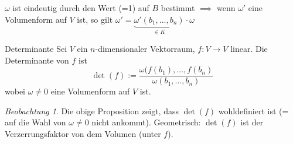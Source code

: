 \documentclass[11pt]{article}
\theoremstyle{remark}
\newtheorem{beobachtung}{Beobachtung}
\theoremstyle{definition}
\theoremstyle{remark}
\begin{document}
\(\omega\) ist eindeutig durch den Wert (=1) auf \(B\) bestimmt \(\implies\)  wenn \(\omega'\) eine Volumenform auf \(V\) ist, so gilt \(\omega' = \underbrace{\omega'(b_1,\dots,b_n)}_{\in K}\cdot\omega\)

\begin{definition}{Determinante}
	Sei \(V\) ein \(n\)-dimensionaler Vektorraum, \(f: V\to V\) linear. Die Determinante von \(f\) ist
	\[\det(f):= \frac{\omega(f(b_1),\dots,f(b_n)}{\omega(b_1,\dots,b_n)}\]
	wobei \(\omega \neq 0\) eine Volumenform auf \(V\) ist.
\end{definition}

\begin{beobachtung}
	Die obige Proposition zeigt, dass \(\det(f)\) wohldefiniert ist (= auf die Wahl von \(\omega\neq 0\) nicht ankommt). Geometrisch: \(\det(f)\) ist der Verzerrungsfaktor von dem Volumen (unter \(f\)).
\end{beobachtung}
\end{document}
